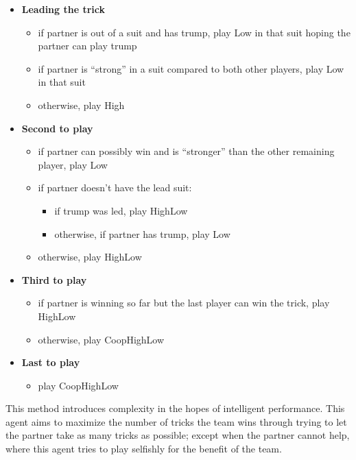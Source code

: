 \begin{itemize}[label={}]
    \item \textbf{Leading the trick}
        \begin{itemize}[noitemsep]
            \item if partner is out of a suit and has trump, play Low in that suit hoping the partner can play trump
            \item if partner is ``strong'' in a suit compared to both other players, play Low in that suit
            \item otherwise, play High
        \end{itemize}
    \item \textbf{Second to play}
        \begin{itemize}[noitemsep]
            \item if partner can possibly win and is ``stronger'' than the other remaining player, play Low
            \item if partner doesn't have the lead suit:
                \begin{itemize}[noitemsep, label={}]
                    \item if trump was led, play HighLow
                    \item otherwise, if partner has trump, play Low
                \end{itemize}
            \item otherwise, play HighLow
        \end{itemize}
    \item \textbf{Third to play}
        \begin{itemize}[noitemsep]
            \item if partner is winning so far but the last player can win the trick, play HighLow
            \item otherwise, play CoopHighLow
        \end{itemize}
    \item \textbf{Last to play}
        \begin{itemize}[noitemsep]
            \item play CoopHighLow
        \end{itemize}
\end{itemize}

This method introduces complexity in the hopes of intelligent performance. This agent aims to maximize the number of tricks the team wins
through trying to let the partner take as many tricks as possible; except when the partner cannot help, where this agent tries to play selfishly
for the benefit of the team.

